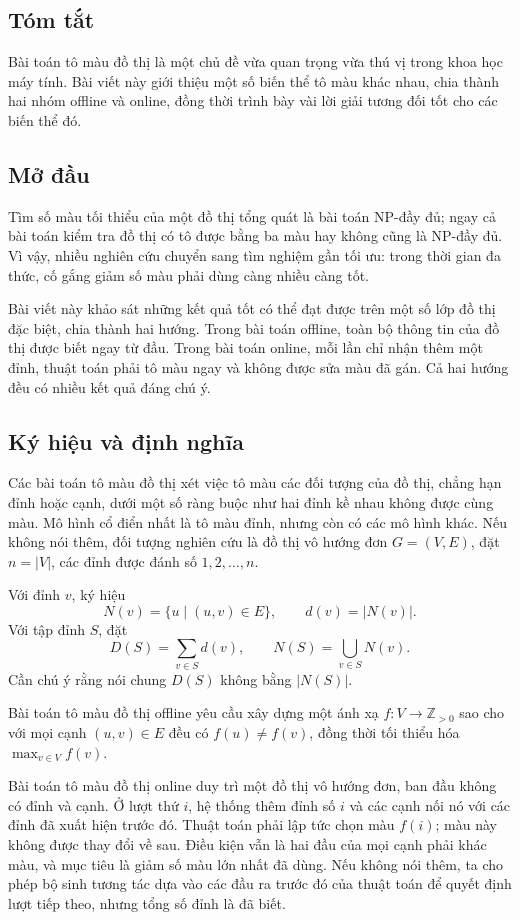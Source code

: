 \documentclass[11pt]{article}
\begin{document}
\subsection*{Tóm tắt}

Bài toán tô màu đồ thị là một chủ đề vừa quan trọng vừa thú vị trong khoa học
máy tính. Bài viết này giới thiệu một số biến thể tô màu khác nhau, chia thành
hai nhóm offline và online, đồng thời trình bày vài lời giải tương đối tốt cho
các biến thể đó.

\subsection{Mở đầu}

Tìm số màu tối thiểu của một đồ thị tổng quát là bài toán NP-đầy đủ; ngay cả
bài toán kiểm tra đồ thị có tô được bằng ba màu hay không cũng là NP-đầy đủ.
Vì vậy, nhiều nghiên cứu chuyển sang tìm nghiệm gần tối ưu: trong thời gian đa
thức, cố gắng giảm số màu phải dùng càng nhiều càng tốt.

Bài viết này khảo sát những kết quả tốt có thể đạt được trên một số lớp đồ thị
đặc biệt, chia thành hai hướng. Trong bài toán offline, toàn bộ thông tin của
đồ thị được biết ngay từ đầu. Trong bài toán online, mỗi lần chỉ nhận thêm một
đỉnh, thuật toán phải tô màu ngay và không được sửa màu đã gán. Cả hai hướng
đều có nhiều kết quả đáng chú ý.

\subsection{Ký hiệu và định nghĩa}

Các bài toán tô màu đồ thị xét việc tô màu các đối tượng của đồ thị, chẳng hạn
đỉnh hoặc cạnh, dưới một số ràng buộc như hai đỉnh kề nhau không được cùng màu.
Mô hình cổ điển nhất là tô màu đỉnh, nhưng còn có các mô hình khác. Nếu không
nói thêm, đối tượng nghiên cứu là đồ thị vô hướng đơn $G=(V,E)$, đặt
$n=|V|$, các đỉnh được đánh số $1,2,\ldots,n$.

Với đỉnh $v$, ký hiệu
\[
  N(v)=\{u\mid (u,v)\in E\},\qquad d(v)=|N(v)|.
\]
Với tập đỉnh $S$, đặt
\[
  D(S)=\sum_{v\in S} d(v),\qquad N(S)=\bigcup_{v\in S}N(v).
\]
Cần chú ý rằng nói chung $D(S)$ không bằng $|N(S)|$.

Bài toán tô màu đồ thị offline yêu cầu xây dựng một ánh xạ
$f:V\to \mathbb{Z}_{>0}$ sao cho với mọi cạnh $(u,v)\in E$ đều có
$f(u)\ne f(v)$, đồng thời tối thiểu hóa $\max_{v\in V} f(v)$.

Bài toán tô màu đồ thị online duy trì một đồ thị vô hướng đơn, ban đầu không có
đỉnh và cạnh. Ở lượt thứ $i$, hệ thống thêm đỉnh số $i$ và các cạnh nối nó với
các đỉnh đã xuất hiện trước đó. Thuật toán phải lập tức chọn màu $f(i)$; màu
này không được thay đổi về sau. Điều kiện vẫn là hai đầu của mọi cạnh phải khác
màu, và mục tiêu là giảm số màu lớn nhất đã dùng. Nếu không nói thêm, ta cho
phép bộ sinh tương tác dựa vào các đầu ra trước đó của thuật toán để quyết định
lượt tiếp theo, nhưng tổng số đỉnh là đã biết.
\end{document}
